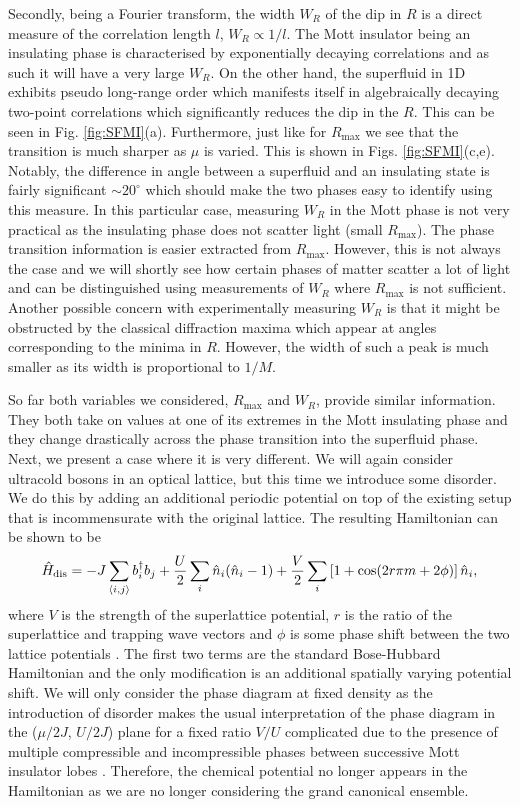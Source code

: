 Secondly, being a Fourier transform, the width $W_R$ of the dip in $R$
is a direct measure of the correlation length $l$, $W_R \propto
1/l$. The Mott insulator being an insulating phase is characterised by
exponentially decaying correlations and as such it will have a very
large $W_R$. On the other hand, the superfluid in 1D exhibits pseudo
long-range order which manifests itself in algebraically decaying
two-point correlations \cite{giamarchi} which significantly reduces
the dip in the $R$. This can be seen in
Fig. \ref{fig:SFMI}(a). Furthermore, just like for $R_\text{max}$ we
see that the transition is much sharper as $\mu$ is varied. This is
shown in Figs. \ref{fig:SFMI}(c,e). Notably, the difference in angle
between a superfluid and an insulating state is fairly significant
$\sim 20^\circ$ which should make the two phases easy to identify
using this measure. In this particular case, measuring $W_R$ in the
Mott phase is not very practical as the insulating phase does not
scatter light (small $R_\mathrm{max}$). The phase transition
information is easier extracted from $R_\mathrm{max}$. However, this
is not always the case and we will shortly see how certain phases of
matter scatter a lot of light and can be distinguished using
measurements of $W_R$ where $R_\mathrm{max}$ is not
sufficient. Another possible concern with experimentally measuring
$W_R$ is that it might be obstructed by the classical diffraction
maxima which appear at angles corresponding to the minima in
$R$. However, the width of such a peak is much smaller as its width is
proportional to $1/M$.

So far both variables we considered, $R_\text{max}$ and $W_R$, provide
similar information. They both take on values at one of its extremes
in the Mott insulating phase and they change drastically across the
phase transition into the superfluid phase. Next, we present a case
where it is very different. We will again consider ultracold bosons in
an optical lattice, but this time we introduce some disorder. We do
this by adding an additional periodic potential on top of the existing
setup that is incommensurate with the original lattice. The resulting
Hamiltonian can be shown to be
\begin{equation}
  \hat{H}_\mathrm{dis} = -J \sum_{\langle i, j \rangle}
  b^\dagger_i b_j + \frac{U}{2} \sum_i \hat{n}_i (\hat{n}_i - 1) +
  \frac{V}{2} \sum_i \left[ 1 + \cos (2 r \pi m + 2 \phi) \right]
  \hat{n}_i,
\end{equation}
where $V$ is the strength of the superlattice potential, $r$ is the
ratio of the superlattice and trapping wave vectors and $\phi$ is some
phase shift between the two lattice potentials \cite{roux2008}. The
first two terms are the standard Bose-Hubbard Hamiltonian and the only
modification is an additional spatially varying potential shift. We
will only consider the phase diagram at fixed density as the
introduction of disorder makes the usual interpretation of the phase
diagram in the ($\mu/2J$, $U/2J$) plane for a
fixed ratio $V/U$ complicated due to the presence of multiple
compressible and incompressible phases between successive Mott
insulator lobes \cite{roux2008}. Therefore, the chemical potential no
longer appears in the Hamiltonian as we are no longer considering the
grand canonical ensemble.

